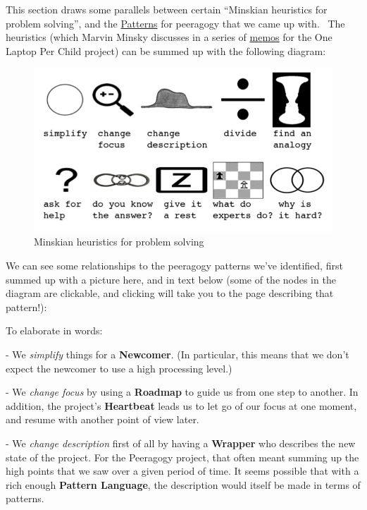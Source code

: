 This section draws some parallels between certain ``Minskian heuristics
for problem solving'', and the
\href{http://peeragogy.org/patterns-usecases/}{Patterns} for peeragogy
that we came up with.~ The heuristics (which Marvin Minsky discusses in
a series of
\href{http://web.media.mit.edu/~minsky/OLPC-1.html}{m}\href{http://web.media.mit.edu/~minsky/OLPC-2.html}{e}\href{http://web.media.mit.edu/~minsky/OLPC-3.html}{m}\href{http://web.media.mit.edu/~minsky/OLPC-4.html}{o}\href{http://web.media.mit.edu/~minsky/OLPC-5.html}{s}
for the One Laptop Per Child project) can be summed up with the
following diagram:

\begin{figure}[htbp]
\centering
\includegraphics[width=\textwidth]{../pictures/heuristic-images.jpg}
\caption{Minskian heuristics for problem solving}
\end{figure}

We can see some relationships to the peeragogy patterns we've
identified, first summed up with a picture here, and in text below (some
of the nodes in the diagram are clickable, and clicking will take you to
the page describing that pattern!):

To elaborate in words:

- We \emph{simplify} things for a \textbf{Newcomer}. (In particular,
this means that we don't expect the newcomer to use a high processing
level.)

- We \emph{change focus} by using a \textbf{Roadmap} to guide us from
one step to another. In addition, the project's \textbf{Heartbeat} leads
us to let go of our focus at one moment, and resume with another point
of view later.

- We \emph{change description} first of all by having a \textbf{Wrapper}
who describes the new state of the project. For the Peeragogy project,
that often meant summing up the high points that we saw over a given
period of time. It seems possible that with a rich enough
\textbf{Pattern Language}, the description would itself be made in terms
of patterns.

